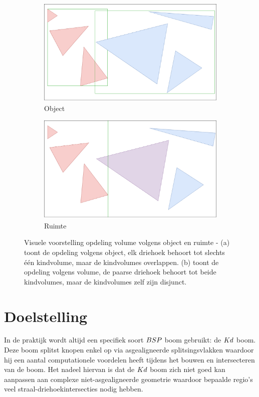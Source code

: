 \begin{figure}
    \centering
    \begin{subfigure}[t]{0.48\linewidth}
        \centering
    \includegraphics[width=\linewidth]{img/objectSplit}
    \caption{Object}
    \label{fig:opdeling-object} 
    \end{subfigure}
    \begin{subfigure}[t]{0.48\linewidth}
        \centering
    \includegraphics[width=\linewidth]{img/volumeSplit}
    \caption{Ruimte}
    \label{fig:opdeling-ruimte} 
    \end{subfigure}
    \caption[Visuele voorstelling opdeling volume volgens object en ruimte]%
{Visuele voorstelling opdeling volume volgens object en ruimte - \small (a) toont de opdeling volgens object, elk driehoek behoort tot slechts één kindvolume, maar de kindvolumes overlappen. (b) toont de opdeling volgens volume, de paarse driehoek behoort tot beide kindvolumes, maar de kindvolumes zelf zijn disjunct. }
\label{fig:opdeling}
\end{figure}

\section{Doelstelling}
In de praktijk wordt altijd een specifiek soort $BSP$ boom gebruikt: de $Kd$ boom.
Deze boom splitst knopen enkel op via asgealigneerde splitsingsvlakken waardoor hij een aantal computationele voordelen heeft tijdens het bouwen en intersecteren van de boom.
Het nadeel hiervan is dat de $Kd$ boom zich niet goed kan aanpassen aan complexe niet-asgealigneerde geometrie waardoor bepaalde regio's veel straal-driehoekintersecties nodig hebben.\\

